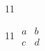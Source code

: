 \documentclass[paper=A4]{ropas-poster}
\begin{document}
\begin{postergrid}{1}{1}
\begin{posterblock}{1}{1}
$\begin{matrix}a&b\\c&d\end{matrix}$
\end{posterblock}
\end{postergrid}
\end{document}
